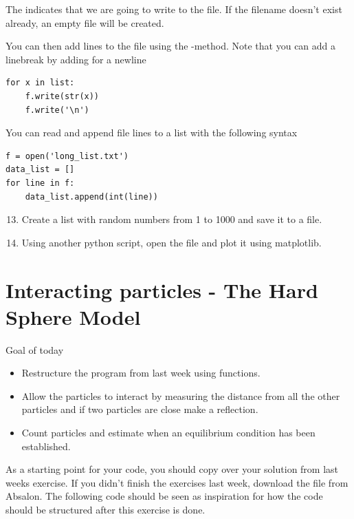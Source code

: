 \documentclass{article}
\begin{document}
The  indicates that we are going to write to the file.
If the filename doesn't exist already, an empty file will be created.

You can then add lines to the file using the -method.
Note that you can add a linebreak by adding  for a newline

\begin{lstlisting}
for x in list:
    f.write(str(x))
    f.write('\n')
\end{lstlisting}

You can read and append file lines to a list with the following syntax
\begin{lstlisting}
f = open('long_list.txt')
data_list = []
for line in f:
    data_list.append(int(line))
\end{lstlisting}

\begin{enumerate}
    \setcounter{enumi}{12}

    \item Create a list with random numbers from 1 to 1000 and save it to a file.

    \item Using another python script, open the file and plot it using matplotlib.

\end{enumerate}


\newpage
\section{Interacting particles - The Hard Sphere Model}

Goal of today

\begin{itemize}
    \item Restructure the program from last week using functions.
    \item Allow the particles to interact by measuring the distance from all
        the other particles and if two particles are close make a reflection.
    \item Count particles and estimate when an equilibrium condition has been established.
\end{itemize}

As a starting point for your code, you should copy over your solution from last
weeks exercise. If you didn't finish the exercises last week, download the file
 from Absalon. The following code should be seen as
inspiration for how the code should be structured after this exercise is done.
\end{document}
